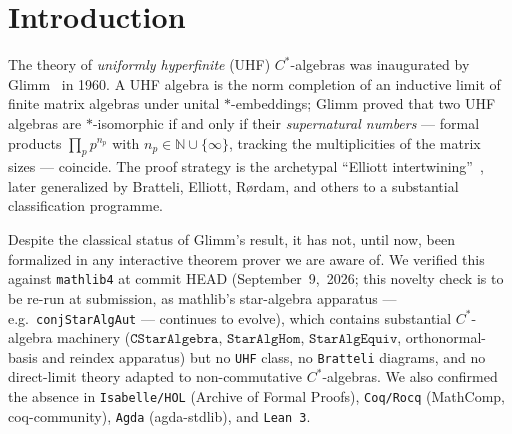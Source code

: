 \documentclass[11pt,a4paper]{article}
\theoremstyle{plain}
\theoremstyle{definition}
\begin{document}
\begin{abstract}
The paired reading is that Principia Fractalis's substrate is now a uniquely-determined mathematical object, and that its $K$-theoretic invariant provably underdetermines the framework's $\alpha$-skeleton. Deriving the $\alpha$-values --- or explicitly declining to --- must therefore happen at a higher layer than the substrate. We discuss the implications in Section~\ref{sec:pf-context}. The formalization contributes several primitives absent from \texttt{mathlib4}, listed in Section~\ref{sec:mathlib-gaps} and offered as candidate upstream contributions.
\end{abstract}

\section{Introduction}
\label{sec:intro}

The theory of \emph{uniformly hyperfinite} (UHF) $C^{\ast}$-algebras was inaugurated by Glimm~\cite{glimm1960} in 1960. A UHF algebra is the norm completion of an inductive limit of finite matrix algebras under unital $\ast$-embeddings; Glimm proved that two UHF algebras are $\ast$-isomorphic if and only if their \emph{supernatural numbers} --- formal products $\prod_p p^{n_p}$ with $n_p \in \mathbb{N} \cup \{\infty\}$, tracking the multiplicities of the matrix sizes --- coincide. The proof strategy is the archetypal ``Elliott intertwining''~\cite{elliott1976}, later generalized by Bratteli, Elliott, R{\o}rdam, and others to a substantial classification programme.

Despite the classical status of Glimm's result, it has not, until now, been formalized in any interactive theorem prover we are aware of. We verified this against \texttt{mathlib4} at commit HEAD (September~9,~2026; this novelty check is to be re-run at submission, as mathlib's star-algebra apparatus --- e.g.\ \texttt{conjStarAlgAut} --- continues to evolve), which contains substantial $C^{\ast}$-algebra machinery ($\texttt{CStarAlgebra}$, $\texttt{StarAlgHom}$, $\texttt{StarAlgEquiv}$, orthonormal-basis and reindex apparatus) but no \texttt{UHF} class, no \texttt{Bratteli} diagrams, and no direct-limit theory adapted to non-commutative $C^{\ast}$-algebras. We also confirmed the absence in \texttt{Isabelle/HOL} (Archive of Formal Proofs), \texttt{Coq/Rocq} (MathComp, coq-community), \texttt{Agda} (agda-stdlib), and \texttt{Lean~3}.
\end{document}
